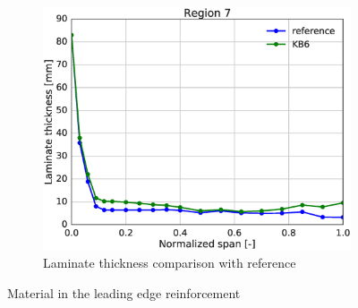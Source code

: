 \begin{figure}[tph]
\begin{subfigure}{\textwidth}
\centering
\includegraphics[width=0.50\linewidth]{figures/KB6_final/KB6_r07_thickness.eps}
\caption{Laminate thickness comparison with reference}
\label{subfig:KB6_thick_r07}
\end{subfigure}
\caption{ Material in the leading edge reinforcement}
\label{fig:KB6_mat_r07}
\end{figure}

